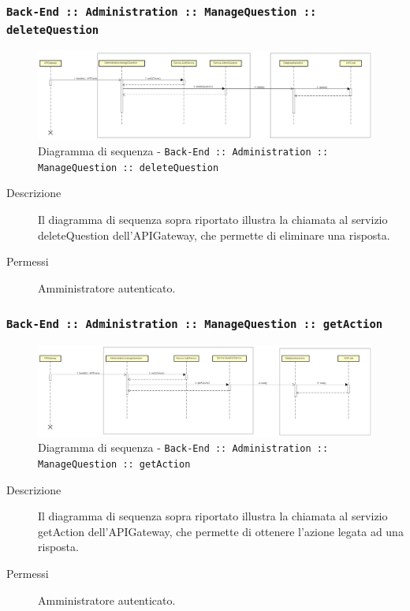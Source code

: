 \documentclass[../DefinizioneDiProdotto_v2.0.0.tex]{subfiles}
\begin{document}
\newpage
\subsubsection{\texttt{Back-End :: Administration :: ManageQuestion :: deleteQuestion}}
\begin{figure}[!h]
	\centering
	\includegraphics[scale=0.3]{DiagrammiSequenza/Back-End/manageQuestion/deleteQuestion.png}
	\caption{Diagramma di sequenza - \texttt{Back-End :: Administration :: ManageQuestion :: deleteQuestion }}
\end{figure}
\begin{description}
	\item [Descrizione] Il diagramma di sequenza sopra riportato  illustra la chiamata al servizio deleteQuestion dell'APIGateway, che permette di eliminare una risposta.
	\item [Permessi] Amministratore autenticato.
\end{description}

\subsubsection{\texttt{Back-End :: Administration :: ManageQuestion :: getAction}}
\begin{figure}[!h]
	\centering
	\includegraphics[scale=0.3]{DiagrammiSequenza/Back-End/manageQuestion/getAction.png}
	\caption{Diagramma di sequenza - \texttt{Back-End :: Administration :: ManageQuestion :: getAction} }
\end{figure}
\begin{description}
	\item [Descrizione] Il diagramma di sequenza sopra riportato illustra la chiamata al servizio getAction dell'APIGateway, che permette di ottenere l'azione legata ad una risposta.
	\item [Permessi] Amministratore autenticato.
\end{description}
\end{document}
